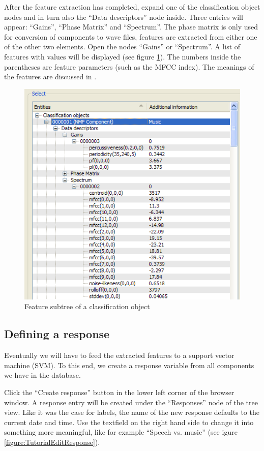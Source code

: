 After the feature extraction has completed, expand one of the classification
object nodes and in turn also the ``Data descriptors'' node inside. Three
entries will appear: ``Gains'', ``Phase Matrix'' and ``Spectrum''. The phase
matrix is only used for conversion of components to wave files, features are
extracted from either one of the other two elements. Open the nodes ``Gains'' or
``Spectrum''. A list of features with values will be displayed (see figure
\ref{figure:TutorialFeatureSubtree}). The numbers inside the parentheses are
feature parameters (such as the MFCC index). The meanings of the features are
discussed in \cite{Schuller2009}.

\begin{figure}
    \centering
    \includegraphics[width=.8\textwidth]{tutorial-media/FeatureSubtree.png}
    \caption{%
        \label{figure:TutorialFeatureSubtree}%
        Feature subtree of a classification object
    }
\end{figure}


\subsection{Defining a response}

Eventually we will have to feed the extracted features to a support vector
machine (SVM). To this end, we create a response variable from all components we
have in the database.

Click the ``Create response'' button in the lower left corner of the browser
window. A response entry will be created under the ``Responses'' node of the
tree view. Like it was the case for labels, the name of the new response
defaults to the current date and time. Use the textfield on the right hand side
to change it into something more meaningful, like for example ``Speech
vs. music'' (see igure \ref{figure:TutorialEditResponse}).


